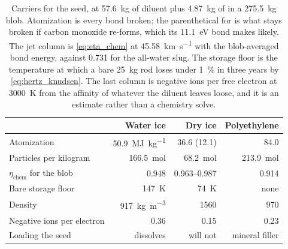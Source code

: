 \documentclass{article}
\begin{document}
\begin{table}[!htpb]
    \centering
    \caption{Carriers for the seed, at \SI{57.6}{\kilogram} of diluent plus \SI{4.87}{\kilogram} of  in a \SI{275.5}{\kilogram} blob. Atomization is every bond broken; the parenthetical for  is what stays broken if carbon monoxide re-forms, which its \SI{11.1}{\electronvolt} bond makes likely. The jet column is \autoref{eq:eta_chem} at \SI{45.58}{\kilo\meter\per\second} with the blob-averaged bond energy, against \num{0.731} for the all-water slug. The storage floor is the temperature at which a bare \SI{25}{\kilogram} rod loses under \SI{1}{\percent} in three years by \autoref{eq:hertz_knudsen}. The last column is negative ions per free electron at \SI{3000}{\kelvin} from the affinity of whatever the diluent leaves loose, and it is an estimate rather than a chemistry solve.}
    \label{tab:seed_carrier}
    \begin{tabular}{|l|r|r|r|}\hline
         & \textbf{Water ice} & \textbf{Dry ice} & \textbf{Polyethylene} \\\hline
        Atomization & \SI{50.9}{\mega\joule\per\kilogram} & \SI{36.6}{} (\num{12.1}) & \SI{84.0}{} \\\hline
        Particles per kilogram & \SI{166.5}{\mole} & \SI{68.2}{\mole} & \SI{213.9}{\mole} \\\hline
        $\eta_{\mathrm{chem}}$ for the blob & \num{0.948} & \numrange{0.963}{0.987} & \num{0.914} \\\hline
        Bare storage floor & \SI{147}{\kelvin} & \SI{74}{\kelvin} & none \\\hline
        Density & \SI{917}{\kilogram\per\cubic\meter} & \SI{1560}{} & \SI{970}{} \\\hline
        Negative ions per electron & \num{0.36} & \num{0.15} & \num{0.23} \\\hline
        Loading the seed & dissolves & will not & mineral filler \\\hline
    \end{tabular}
\end{table}
\end{document}
